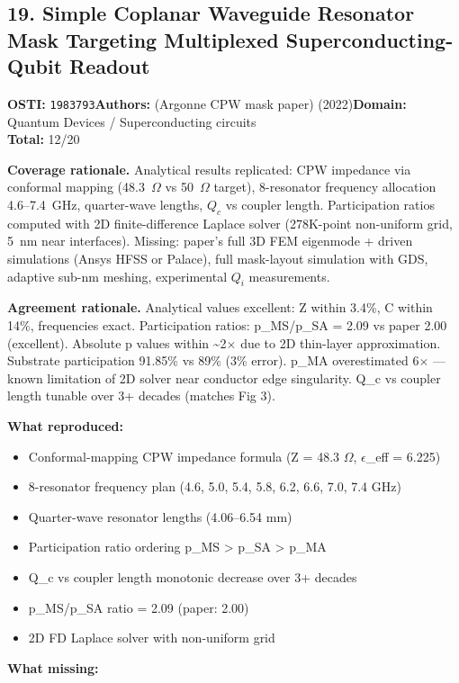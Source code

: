 \subsection{19. Simple Coplanar Waveguide Resonator Mask Targeting Multiplexed Superconducting-Qubit Readout}
\textbf{OSTI:} \texttt{1983793}\quad\textbf{Authors:} (Argonne CPW mask paper) (2022)\quad\textbf{Domain:} Quantum Devices / Superconducting circuits\\
\quad{}\quad\textbf{Total:} 12/20\par\smallskip
\noindent\textbf{Coverage rationale.} Analytical results replicated: CPW impedance via conformal mapping (48.3~$\Omega$ vs 50~$\Omega$ target), 8-resonator frequency allocation 4.6--7.4~GHz, quarter-wave lengths, $Q_c$ vs coupler length. Participation ratios computed with 2D finite-difference Laplace solver (278K-point non-uniform grid, 5~nm near interfaces). Missing: paper's full 3D FEM eigenmode + driven simulations (Ansys HFSS or Palace), full mask-layout simulation with GDS, adaptive sub-nm meshing, experimental $Q_i$ measurements.\par
\noindent\textbf{Agreement rationale.} Analytical values excellent: Z within 3.4\%, C within 14\%, frequencies exact. Participation ratios: p\_MS/p\_SA = 2.09 vs paper 2.00 (excellent). Absolute p values within \textasciitilde{}2$\times$ due to 2D thin-layer approximation. Substrate participation 91.85\% vs 89\% (3\% error). p\_MA overestimated 6$\times$ --- known limitation of 2D solver near conductor edge singularity. Q\_c vs coupler length tunable over 3+ decades (matches Fig 3).\par\smallskip
\noindent\textbf{What reproduced:}
\begin{itemize}[leftmargin=1.4em,itemsep=0.2em,topsep=0.2em]
\item Conformal-mapping CPW impedance formula (Z = 48.3 $\Omega$, $\epsilon$\_eff = 6.225)
\item 8-resonator frequency plan (4.6, 5.0, 5.4, 5.8, 6.2, 6.6, 7.0, 7.4 GHz)
\item Quarter-wave resonator lengths (4.06--6.54 mm)
\item Participation ratio ordering p\_MS \textgreater{} p\_SA \textgreater{} p\_MA
\item Q\_c vs coupler length monotonic decrease over 3+ decades
\item p\_MS/p\_SA ratio = 2.09 (paper: 2.00)
\item 2D FD Laplace solver with non-uniform grid
\end{itemize}\noindent\textbf{What missing:}

